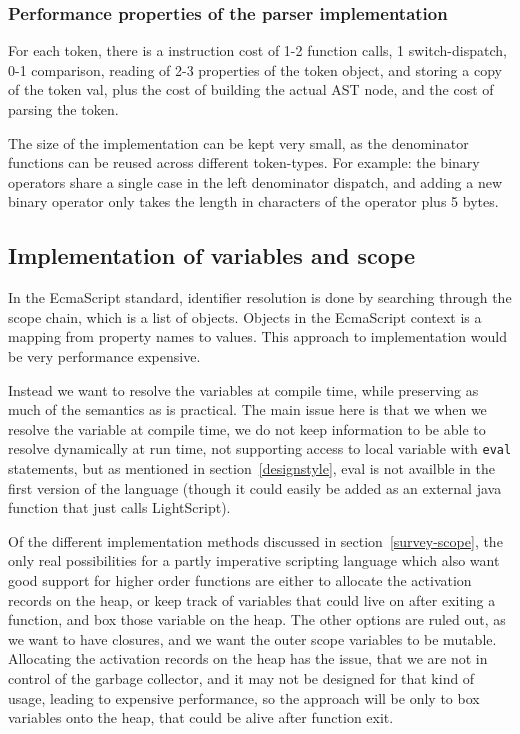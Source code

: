 \documentclass[11pt]{report}
\begin{document}
\subsubsection{Performance properties of the parser implementation}

For each token, there is a instruction cost of 1-2 function calls, 1 switch-dispatch, 0-1 comparison, reading of 2-3 properties of the token object, and storing a copy of the token val, plus the cost of building the actual AST node, and the cost of parsing the token.

The size of the implementation can be kept very small, as the denominator functions can be reused across different token-types. For example: the binary operators share a single case in the left denominator dispatch, and adding a new binary operator only takes the length in characters of the operator plus 5 bytes. 

\subsection{Implementation of variables and scope}
In the EcmaScript standard, identifier resolution is done by searching through the scope chain, which is a list of objects. Objects in the EcmaScript context is a mapping from property names to values. This approach to implementation would be very performance expensive.

Instead we want to resolve the variables at compile time, while preserving as much of the semantics as is practical. The main issue here is that we when we resolve the variable at compile time, we do not keep information to be able to resolve dynamically at run time, not supporting access to local variable with \verb|eval| statements, but as mentioned in section~\ref{designstyle}, eval is not availble in the first version of the language (though it could easily be added as an external java function that just calls LightScript).

Of the different implementation methods discussed in section~\ref{survey-scope}, the only real possibilities for a partly imperative scripting language which also want good support for higher order functions are either to allocate the activation records on the heap, or keep track of variables that could live on after exiting a function, and box those variable on the heap.
The other options are ruled out, as we want to have closures, and we want the outer scope variables to be mutable.
Allocating the activation records on the heap has the issue, that we are not in control of the garbage collector, and it may not be designed for that kind of usage, leading to expensive performance, so the approach will be only to box variables onto the heap, that could be alive after function exit.
\end{document}
